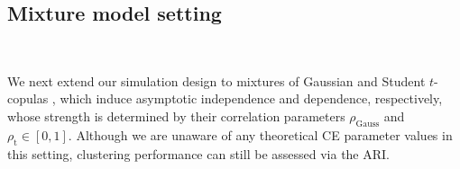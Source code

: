 \documentclass[12pt]{article}
\newcommand{\rhou}[1]{\rho_{\text{#1}}}
\begin{document}
\subsection{Mixture model setting}~\label{subsec:sim_mixture}


We next extend our simulation design to mixtures of Gaussian and Student $t$-copulas \citep{Demarta2007-ap}, which induce asymptotic independence and dependence, respectively, whose strength is determined by their correlation parameters $\rho_{\text{Gauss}}$ and $\rho_{\text{t}} \in [0, 1]$.
Although we are unaware of any theoretical CE parameter values in this setting, clustering performance can still be assessed via the ARI.  

\end{document}
